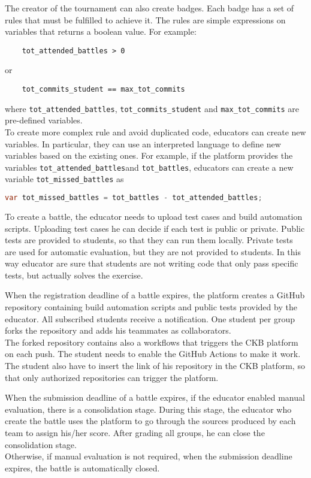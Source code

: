 The creator of the tournament can also create badges.
Each badge has a set of rules that must be fulfilled to achieve it.
The rules are simple expressions on variables that returns a boolean value.
For example:
\begin{lstlisting}
    tot_attended_battles > 0
\end{lstlisting}
or
\begin{lstlisting}
    tot_commits_student == max_tot_commits
\end{lstlisting}
where \lstinline{tot_attended_battles}, \lstinline{tot_commits_student} and \lstinline{max_tot_commits} are pre-defined variables.\\
To create more complex rule and avoid duplicated code, educators can create new variables.
In particular, they can use an interpreted language to define new variables based on the existing ones.
For example, if the platform provides the variables \lstinline{tot_attended_battles}and \lstinline{tot_battles},
educators can create a new variable \lstinline{tot_missed_battles} as
\begin{lstlisting}[language=java, morekeywords={var}, keywordstyle=\color{blue}]
    var tot_missed_battles = tot_battles - tot_attended_battles;
\end{lstlisting}

To create a battle, the educator needs to upload test cases and build automation scripts.
Uploading test cases he can decide if each test is public or private.
Public tests are provided to students, so that they can run them locally.
Private tests are used for automatic evaluation, but they are not provided to students.
In this way educator are sure that students are not writing code that only pass specific tests, but actually solves the exercise.

When the registration deadline of a battle expires, the platform creates a GitHub repository containing build automation scripts and public tests provided by the educator.
All subscribed students receive a notification.
One student per group forks the repository and adds his teammates as collaborators.\\
The forked repository contains also a workflows that triggers the CKB platform on each push.
The student needs to enable the GitHub Actions to make it work.
The student also have to insert the link of his repository in the CKB platform, so that only authorized repositories can trigger the platform.

When the submission deadline of a battle expires, if the educator enabled manual evaluation, there is a consolidation stage.
During this stage, the educator who create the battle uses the platform to go through the sources produced by each team to assign his/her score.
After grading all groups, he can close the consolidation stage.\\
Otherwise, if manual evaluation is not required, when the submission deadline expires, the battle is automatically closed.

